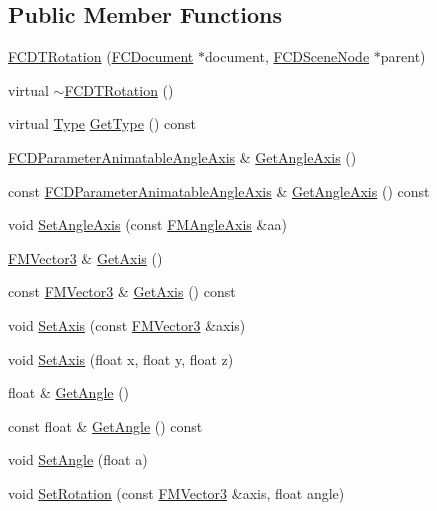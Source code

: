 \subsection*{Public Member Functions}
\begin{DoxyCompactItemize}
\item 
\hyperlink{classFCDTRotation_ae92f4d8903836a1bf832a2c1ca42eb90}{FCDTRotation} (\hyperlink{classFCDocument}{FCDocument} $\ast$document, \hyperlink{classFCDSceneNode}{FCDSceneNode} $\ast$parent)
\item 
virtual \hyperlink{classFCDTRotation_adca97a7bdd9f3cd6f31712dce21a610b}{$\sim$FCDTRotation} ()
\item 
virtual \hyperlink{classFCDTransform_a13e561c5e53aeaf84dedf4661cdc8921}{Type} \hyperlink{classFCDTRotation_af5ddd1b7b673eaa1d57f36b4e685a3c8}{GetType} () const 
\item 
\hyperlink{classFCDParameterAnimatableT}{FCDParameterAnimatableAngleAxis} \& \hyperlink{classFCDTRotation_a3fd21b3f969e19041caab33747e2a109}{GetAngleAxis} ()
\item 
const \hyperlink{classFCDParameterAnimatableT}{FCDParameterAnimatableAngleAxis} \& \hyperlink{classFCDTRotation_afce9e601d1581ea6da3e2723cb5c0ebe}{GetAngleAxis} () const 
\item 
void \hyperlink{classFCDTRotation_a0ff581af572642dfa7506402d28ef6fb}{SetAngleAxis} (const \hyperlink{classFMAngleAxis}{FMAngleAxis} \&aa)
\item 
\hyperlink{classFMVector3}{FMVector3} \& \hyperlink{classFCDTRotation_a2c5629790e8172222f1095be97728e6f}{GetAxis} ()
\item 
const \hyperlink{classFMVector3}{FMVector3} \& \hyperlink{classFCDTRotation_a2049a1603120ef757614c31110a18a4d}{GetAxis} () const 
\item 
void \hyperlink{classFCDTRotation_a3aa0b0cccfcdb7cea0070bcf0b9b557b}{SetAxis} (const \hyperlink{classFMVector3}{FMVector3} \&axis)
\item 
void \hyperlink{classFCDTRotation_a550e50cede877e255589506c9fbc2e34}{SetAxis} (float x, float y, float z)
\item 
float \& \hyperlink{classFCDTRotation_a521fd665dca9d5a92450467a5680a156}{GetAngle} ()
\item 
const float \& \hyperlink{classFCDTRotation_ab6b9d98eac74729fc5c0c55a13bac478}{GetAngle} () const 
\item 
void \hyperlink{classFCDTRotation_a097be8d6e0d8f52e9a2da884d3d397ae}{SetAngle} (float a)
\item 
void \hyperlink{classFCDTRotation_a6ebf1ce90ac3247d924190652e595d7f}{SetRotation} (const \hyperlink{classFMVector3}{FMVector3} \&axis, float angle)

\end{DoxyCompactItemize}
